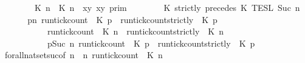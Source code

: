 \begin{isabellebody}
{}\isanewline
\ \ \ \ \ \ {\isasymlbrakk}\ {\isacharparenleft}{\isasymlceil}{\isacharhash}\isactrlsup {\isasymle}\ K\ n{\isacharcomma}\ {\isacharhash}\isactrlsup {\isacharless}\ K\ n{\isasymrceil}\ {\isasymin}\ {\isacharparenleft}{\isasymlambda}{\isacharparenleft}x{\isacharcomma}y{\isacharparenright}{\isachardot}\ x{\isasymle}y{\isacharparenright}{\isacharparenright}\ {\isasymrbrakk}\isactrlsub p\isactrlsub r\isactrlsub i\isactrlsub m\isanewline
\ \ \ \ \ \ {\isasyminter}\ {\isasymlbrakk}\ K\ strictly\ precedes\ K\ {\isasymrbrakk}\isactrlsub T\isactrlsub E\isactrlsub S\isactrlsub L\isactrlbsup {\isasymge}\ Suc\ n\isactrlesup {\isacartoucheclose}\isanewline
%
\isadelimproof
%
\endisadelimproof
%
\isatagproof
{}\isamarkupfalse%
\ {\isacharminus}\isanewline
\ \ \isamarkupfalse%
\ {\isacartoucheopen}{\isacharbraceleft}{\isasymrho}{\isachardot}\ {\isasymforall}p{\isasymge}n{\isachardot}\ {\isacharparenleft}run{\isacharunderscore}tick{\isacharunderscore}count\ {\isasymrho}\ K\ p{\isacharparenright}\ {\isasymle}\ {\isacharparenleft}run{\isacharunderscore}tick{\isacharunderscore}count{\isacharunderscore}strictly\ {\isasymrho}\ K\ p{\isacharparenright}{\isacharbraceright}\isanewline
\ \ \ \ \ \ \ \ \ {\isacharequal}\ {\isacharbraceleft}{\isasymrho}{\isachardot}\ {\isacharparenleft}run{\isacharunderscore}tick{\isacharunderscore}count\ {\isasymrho}\ K\ n{\isacharparenright}\ {\isasymle}\ {\isacharparenleft}run{\isacharunderscore}tick{\isacharunderscore}count{\isacharunderscore}strictly\ {\isasymrho}\ K\ n{\isacharparenright}{\isacharbraceright}\isanewline
\ \ \ \ \ \ \ \ \ {\isasyminter}\ {\isacharbraceleft}{\isasymrho}{\isachardot}\ {\isasymforall}p{\isasymge}Suc\ n{\isachardot}\ {\isacharparenleft}run{\isacharunderscore}tick{\isacharunderscore}count\ {\isasymrho}\ K\ p{\isacharparenright}\ {\isasymle}\ {\isacharparenleft}run{\isacharunderscore}tick{\isacharunderscore}count{\isacharunderscore}strictly\ {\isasymrho}\ K\ p{\isacharparenright}{\isacharbraceright}{\isacartoucheclose}\isanewline
\ \ \ \ \isamarkupfalse%
\ forall{\isacharunderscore}nat{\isacharunderscore}set{\isacharunderscore}suc{\isacharbrackleft}of\ {\isacartoucheopen}n{\isacartoucheclose}\ {\isacartoucheopen}{\isasymlambda}{\isasymrho}\ n{\isachardot}\ {\isacharparenleft}run{\isacharunderscore}tick{\isacharunderscore}count\ {\isasymrho}\ K\ n{\isacharparenright}\isanewline

\end{isabellebody}

